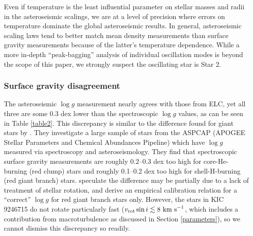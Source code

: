 Even if temperature is the least influential parameter on stellar masses and radii in the asteroseismic scalings, we are at a level of precision where errors on temperature dominate the global asteroseismic results. In general, asteroseismic scaling laws tend to better match mean density measurements than surface gravity measurements because of the latter's temperature dependence. While a more in-depth ``peak-bagging'' analysis of individual oscillation modes is beyond the scope of this paper, we strongly suspect the oscillating star is Star 2.

\subsubsection{Surface gravity disagreement}
The asteroseismic $\log g$ measurement nearly agrees with those from ELC, yet all three are some 0.3 dex lower than the spectroscopic $\log g$ values, as can be seen in Table \ref{table2}. This discrepancy is similar to the difference found for giant stars by \citet{hol15}. They investigate a large sample of stars from the ASPCAP (APOGEE Stellar Parameters and Chemical Abundances Pipeline) which have $\log g$ measured via spectroscopy and asteroseismology. They find that spectroscopic surface gravity measurements are roughly 0.2--0.3 dex too high for core-He-burning (red clump) stars and roughly 0.1--0.2 dex too high for shell-H-burning (red giant branch) stars. \citet{hol15} speculate the difference may be partially due to a lack of treatment of stellar rotation, and derive an empirical calibration relation for a ``correct'' $\log g$ for red giant branch stars only. However, the stars in KIC 9246715 do not rotate particularly fast ($v_{\rm{rot}} \sin i \lesssim 8 \ \rm{km \ s}^{-1}$, which includes a contribution from macroturbulence as discussed in Section \ref{parameters}), so we cannot dismiss this discrepancy so readily.

  